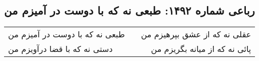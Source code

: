 \begin{center}
\section*{رباعی شماره ۱۴۹۲: طبعی نه که با دوست در آمیزم من}
\label{sec:1492}
\begin{longtable}{l p{0.5cm} r}
طبعی نه که با دوست در آمیزم من
&&
عقلی نه که از عشق بپرهیزم من
\\
دستی نه که با قضا درآویزم من
&&
پائی نه که از میانه بگریزم من
\\
\end{longtable}
\end{center}
